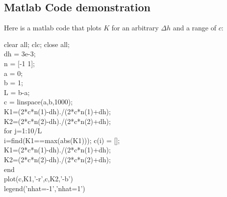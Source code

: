 \documentclass[11pt]{article}
\begin{document}
\subsection{Matlab Code demonstration}
Here is a matlab code that plots $K$ for an arbitrary $\Delta h$ and a range of $c$:

clear all; clc; close all; \\
dh = 3e-3; \\
n = [-1 1]; \\
a = 0; \\
b = 1; \\
L = b-a; \\
c = linspace(a,b,1000); \\
K1=(2*c*n(1)-dh)./(2*c*n(1)+dh); \\
K2=(2*c*n(2)-dh)./(2*c*n(2)+dh); \\
for j=1:10/L \\
  i=find(K1==max(abs(K1))); c(i) = []; \\
  K1=(2*c*n(1)-dh)./(2*c*n(1)+dh); \\
  K2=(2*c*n(2)-dh)./(2*c*n(2)+dh); \\
end \\
plot(c,K1,'-r',c,K2,'-b') \\
legend('nhat=-1','nhat=1') \\
\end{document}
